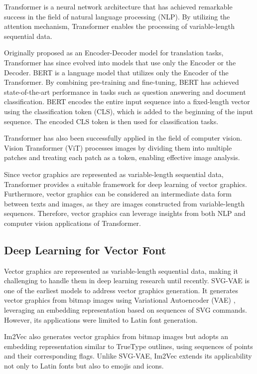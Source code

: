 Transformer \cite{vaswani2017attention} is a neural network architecture that has achieved remarkable success in the field of natural language processing (NLP).
By utilizing the attention mechanism, Transformer enables the processing of variable-length sequential data.

Originally proposed as an Encoder-Decoder model for translation tasks, Transformer has since evolved into models that use only the Encoder or the Decoder.
BERT \cite{devlin2019bert} is a language model that utilizes only the Encoder of the Transformer.
By combining pre-training and fine-tuning, BERT has achieved state-of-the-art performance in tasks such as question answering and document classification.
BERT encodes the entire input sequence into a fixed-length vector using the classification token (CLS), which is added to the beginning of the input sequence.
The encoded CLS token is then used for classification tasks.

Transformer has also been successfully applied in the field of computer vision.
Vision Transformer (ViT) \cite{dosovitskiy2021an} processes images by dividing them into multiple patches and treating each patch as a token, enabling effective image analysis.

Since vector graphics are represented as variable-length sequential data, Transformer provides a suitable framework for deep learning of vector graphics.
Furthermore, vector graphics can be considered an intermediate data form between texts and images, as they are images constructed from variable-length sequences.
Therefore, vector graphics can leverage insights from both NLP and computer vision applications of Transformer.

\subsection{Deep Learning for Vector Font}

Vector graphics are represented as variable-length sequential data, making it challenging to handle them in deep learning research until recently.
SVG-VAE \cite{lopes2019svg} is one of the earliest models to address vector graphics generation.
It generates vector graphics from bitmap images using Variational Autoencoder (VAE) \cite{kingma2022auto}, leveraging an embedding representation based on sequences of SVG commands.
However, its applications were limited to Latin font generation.

Im2Vec \cite{reddy2021im2vec} also generates vector graphics from bitmap images but adopts an embedding representation similar to TrueType outlines, using sequences of points and their corresponding flags.
Unlike SVG-VAE, Im2Vec extends its applicability not only to Latin fonts but also to emojis and icons.

